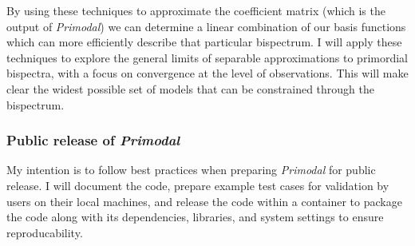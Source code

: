 By using these techniques to approximate the coefficient matrix (which is the output of \textit{Primodal})
we can determine a linear combination of our basis functions which can more efficiently
describe that particular bispectrum.
I will apply these techniques to explore the general limits of separable approximations to primordial bispectra,
with a focus on convergence at the level of observations. This will make clear the widest possible set
of models that can be constrained through the bispectrum.

\subsubsection*{Public release of \textit{Primodal}}
My intention is to follow best practices when preparing \textit{Primodal} for
public release. I will document the code, prepare example test cases for validation by users
on their local machines,
and release the code within a container to package the code along with its
dependencies, libraries, and system settings to ensure reproducability.

